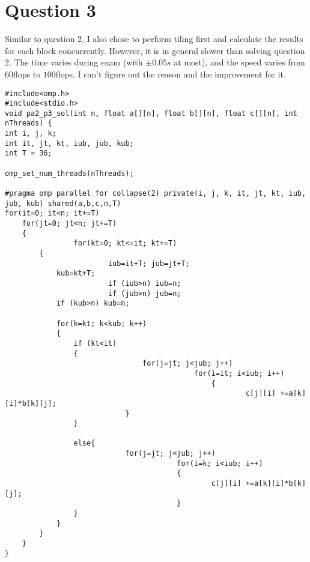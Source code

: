 \documentclass[11pt]{amsart}
\begin{document}
\section*{Question 3}
Similar to question 2, I also chose to perform tiling first and calculate the results for each block concurrently. However, it is in general slower than solving question 2. The time varies during exam (with $\pm 0.05s$ at most), and the speed varies from $60$flops to $100$flops. I can't figure out the reason and the improvement for it.
\begin{lstlisting}
#include<omp.h>
#include<stdio.h>
void pa2_p3_sol(int n, float a[][n], float b[][n], float c[][n], int nThreads) {
int i, j, k;
int it, jt, kt, iub, jub, kub;
int T = 36;

omp_set_num_threads(nThreads);

#pragma omp parallel for collapse(2) private(i, j, k, it, jt, kt, iub, jub, kub) shared(a,b,c,n,T)
for(it=0; it<n; it+=T)
	for(jt=0; jt<n; jt+=T)
	{
                for(kt=0; kt<=it; kt+=T)
		{
                        iub=it+T; jub=jt+T;
			kub=kt+T;
                        if (iub>n) iub=n;
                        if (jub>n) jub=n;
			if (kub>n) kub=n;
			
			for(k=kt; k<kub; k++)
			{
				if (kt<it)
				{
		                        for(j=jt; j<jub; j++)  
	                                		for(i=it; i<iub; i++)
	                                        	{
	                                                	c[j][i] +=a[k][i]*b[k][j];
							}
				}
			
				else{
			             	for(j=jt; j<jub; j++)
		                                for(i=k; i<iub; i++)
		                                {
		                                        c[j][i] +=a[k][i]*b[k][j];
		                                }						
				}
			}
		}
	}
}
\end{lstlisting}
\newpage
\end{document}
